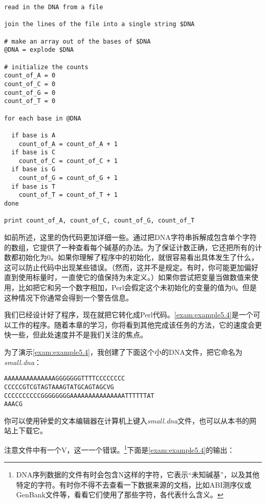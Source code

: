 \begin{lstlisting}
read in the DNA from a file

join the lines of the file into a single string $DNA

# make an array out of the bases of $DNA
@DNA = explode $DNA

# initialize the counts
count_of_A = 0
count_of_C = 0
count_of_G = 0
count_of_T = 0

for each base in @DNA

  if base is A
    count_of_A = count_of_A + 1
  if base is C
    count_of_C = count_of_C + 1
  if base is G
    count_of_G = count_of_G + 1
  if base is T
    count_of_T = count_of_T + 1
done

print count_of_A, count_of_C, count_of_G, count_of_T
\end{lstlisting}

如前所述，这里的伪代码更加详细一些。通过把DNA字符串拆解成包含单个字符的数组，它提供了一种查看每个碱基的办法。为了保证计数正确，它还把所有的计数都初始化为0。如果你理解了程序中的初始化，就很容易看出具体发生了什么，这可以防止代码中出现某些错误。（然而，这并不是规定。有时，你可能更加偏好直到使用标量时，一直使它的值保持为未定义。）如果你尝试把变量当做数值来使用，比如把它和另一个数字相加，Perl会假定这个未初始化的变量的值为0。但是这种情况下你通常会得到一个警告信息。

我们已经设计好了程序，现在就把它转化成Perl代码。\autoref{exam:example5.4}是一个可以工作的程序。随着本章的学习，你将看到其他完成该任务的方法，它的速度会更快一些，但此处速度并不是我们关注的焦点。



为了演示\autoref{exam:example5.4}，我创建了下面这个小的DNA文件，把它命名为\textit{small.dna}：

\begin{lstlisting}
AAAAAAAAAAAAAAGGGGGGGTTTTCCCCCCCC
CCCCCGTCGTAGTAAAGTATGCAGTAGCVG
CCCCCCCCCCGGGGGGGGAAAAAAAAAAAAAAATTTTTTAT
AAACG
\end{lstlisting}

你可以使用钟爱的文本编辑器在计算机上键入\textit{small.dna}文件，也可以从本书的网站上下载它。

注意文件中有一个V，这一一个错误。\footnote{DNA序列数据的文件有时会包含N这样的字符，它表示“未知碱基”，以及其他特定的字符。有时你不得不去查看一下数据来源的文档，比如ABI测序仪或GenBank文件等，看看它们使用了那些字符，各代表什么含义。}下面是\autoref{exam:example5.4}的输出：


